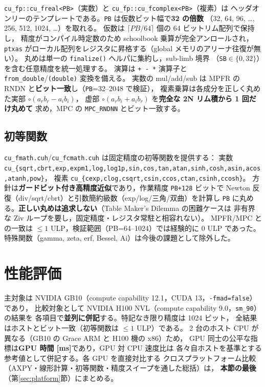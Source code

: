 \documentclass[uplatex,dvipdfmx,a4paper,11pt]{jsarticle}
\newcommand{\code}[1]{\texttt{#1}}
\begin{document}
\code{cu\_fp::cu\_freal<PB>}（実数）と \code{cu\_fp::cu\_fcomplex<PB>}（複素）は
ヘッダオンリーのテンプレートである。\code{PB} は仮数ビット幅で\textbf{32 の倍数}
（32, 64, 96, \dots, 256, 512, 1024, \dots）を取れる。
仮数は $\lceil PB/64\rceil$ 個の 64 ビットリム配列で保持し，
精度がコンパイル時定数のため schoolbook 乗算が完全アンロールされ，
\code{ptxas} がローカル配列をレジスタに昇格する（global メモリのアリーナ往復が無い）。
丸めは単一の \code{finalize()} ヘルパに集約し，sub-limb 境界
（\code{SB}$\in\{0,32\}$）を含む任意精度を統一処理する。
演算は \code{+ - *} 演算子と \code{from\_double}/\code{(double)} 変換を備える。
実数の mul/add/sub は MPFR の RNDN と\textbf{ビット一致}し（\code{PB}=32--2048 で検証），
複素乗算は各成分を正しく丸めた実部 $\circ(a_r b_r - a_i b_i)$，
虚部 $\circ(a_r b_i + a_i b_r)$ を\textbf{完全な 2N リム積から 1 回だけ丸めて}
求め，MPC の \code{MPC\_RNDNN} とビット一致する。

\subsection{初等関数}

\code{cu\_fmath.cuh}/\code{cu\_fcmath.cuh} は固定精度の初等関数を提供する：
実数 \code{cu\_\{sqrt,cbrt,exp,expm1,log,log1p,sin,cos,tan,atan,sinh,cosh,asin,acos,atanh,pow\}}，
複素 \code{cu\_\{cexp,clog,csqrt,csin,ccos,ctan,csinh,ccosh\}}。
方針は\textbf{ガードビット付き高精度近似}であり，作業精度 \code{PB+128} ビットで
Newton 反復（div/sqrt/cbrt）と引数簡約級数（exp/log/三角/双曲）を計算し
\code{PB} に丸める。\textbf{正しい丸めは追求しない}（Table Maker's Dilemma の困難ケースは
非有界な Ziv ループを要し，固定精度・レジスタ常駐と相容れない）。
MPFR/MPC との一致は $\le 1$ ULP，検証範囲（PB=64--1024）では経験的に 0 ULP であった。
特殊関数（gamma, zeta, erf, Bessel, Ai）は今後の課題として除外した。

\section{性能評価}
\label{sec:perf}

主対象は NVIDIA GB10（compute capability 12.1，CUDA 13，\code{-fmad=false}）であり，
比較対象として NVIDIA H100 NVL（compute capability 9.0，\code{sm\_90}）の結果を
各項目で\textbf{並列に併記}する。特記なき限り精度は 1024 ビット，
全結果はホストとビット一致（初等関数は $\le 1$ ULP）である。
2 台のホスト CPU が異なる（GB10 の Grace ARM と H100 機の x86）ため，
GPU 同士の公平な指標は\textbf{GPU 時間 [ms]}であり，GPU 対 CPU 速度比は
各々自ホストを基準とする参考値として併記する。各 GPU を直接対比する
クロスプラットフォーム比較（AXPY・線形計算・初等関数・精度スイープを通した総括）は，
\textbf{本節の最後}（第\ref{sec:platform}節）にまとめる。
\end{document}
